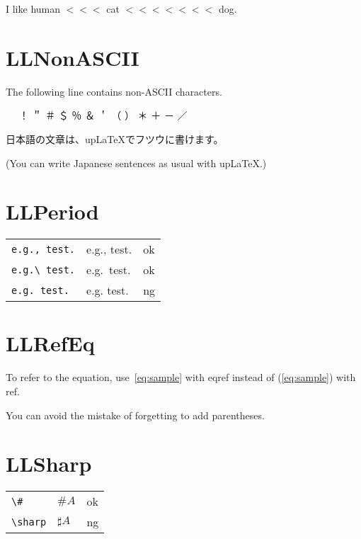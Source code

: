 \documentclass[a4paper]{article}
\newcommand{\tA}[1]{\textcolor{cA}{#1}}
\newcommand{\tD}[1]{\textcolor{cD}{#1}}
\begin{document}
I like human $<<<$ cat $<<<<<<<$ dog.

\section{LLNonASCII}

The following line contains non-ASCII characters.

\begin{CJK}{UTF8}{ipxm}{　} ！ ＂ ＃ ＄ ％ ＆ ＇ （ ） ＊ ＋ － ／\end{CJK}

\vspace{\baselineskip}

\begin{CJK}{UTF8}{ipxm}日本語の文章は、upLaTeXでフツウに書けます。\end{CJK}

(You can write Japanese sentences as usual with upLaTeX.)

\section{LLPeriod}

\begin{table}[H]
	\centering
	\begin{tabular}{lll}
		\verb|e.g., test.| & e.g., test. & \tA{ok} \\
		\verb|e.g.\ test.| & e.g.\ test. & \tA{ok} \\
		\verb|e.g. test.|  & e.g. test.  & \tD{ng} \\
	\end{tabular}
\end{table}

\section{LLRefEq}

To refer to the equation, use~\eqref{eq:sample} with eqref instead of (\ref{eq:sample}) with ref.

You can avoid the mistake of forgetting to add parentheses.

\section{LLSharp}

\begin{table}[H]
	\centering
	\begin{tabular}{lll}
		\verb|\#|     & $\#A$      & \tA{ok} \\
		\verb|\sharp| & $\sharp A$ & \tD{ng}
	\end{tabular}
\end{table}
\end{document}
